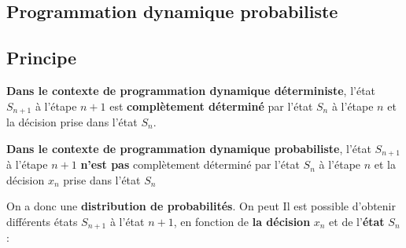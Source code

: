 \documentclass{report}
\begin{document}
\begin{multicols*}{2}
    \chapter{Programmation dynamique probabiliste}

    \section{Principe}
    \textcolor{myr}{\textbf{Dans le contexte de programmation dynamique déterministe}}, l'état $S_{n+1}$ à l'étape $n+1$ est \textbf{complètement déterminé}                                
    par l'état $S_n$ à l'étape $n$ et la décision prise 
    dans l'état $S_n$. 


    \begin{figure}[H]
    \centering
    \end{figure}

    \textcolor{myr}{\textbf{Dans le contexte de programmation dynamique probabiliste}}, l'état $S_{n+1}$ à l'étape $n+1$ \textbf{n'est pas} 
    complètement déterminé par l'état $S_n$ à l'étape $n$ 
    et la décision $x_n$ prise dans l'état $S_n$

    On a donc une \textbf{distribution de probabilités}. On peut 
    Il est possible d'obtenir différents états $S_{n+1}$ 
    à l'état $n + 1$, en fonction de \textbf{la décision} $x_n$ 
    et de l'\textbf{état} $S_n$ : 








\end{multicols*}
\end{document}
